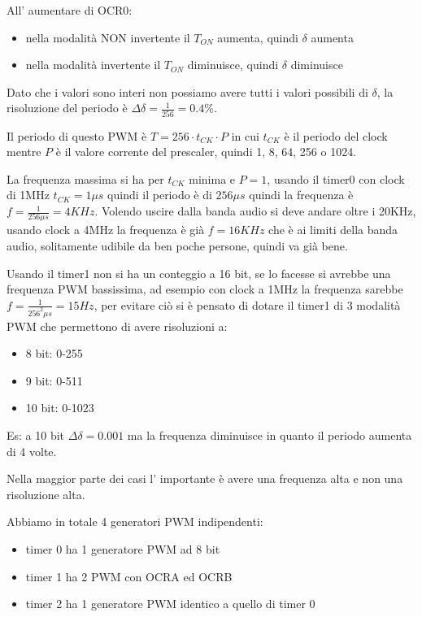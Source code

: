 All' aumentare di OCR0:
\begin{itemize}
    \item nella modalità NON invertente il $T_{ON}$ aumenta, quindi $\delta$ aumenta
    \item nella modalità invertente il $T_{ON}$ diminuisce, quindi $\delta$ diminuisce
\end{itemize}

Dato che i valori sono interi non possiamo avere tutti i valori possibili di $\delta$, la risoluzione del periodo è $\Delta\delta = \frac{1}{256} = 0.4\%$.

Il periodo di questo PWM è $T = 256 \cdot t_{CK} \cdot P$ in cui $t_{CK}$ è il periodo del clock mentre $P$ è il valore corrente del prescaler, quindi 1, 8, 64, 256 o 1024.

La frequenza massima si ha per $t_{CK}$ minima e $P=1$, usando il timer0 con clock di 1MHz $t_{CK} = 1 \mu s$ quindi il periodo è di $256 \mu s$ quindi la frequenza è $f = \frac{1}{256\mu s} = 4KHz$.
Volendo uscire dalla banda audio si deve andare oltre i 20KHz, usando clock a 4MHz la frequenza è già $f = 16KHz$ che è ai limiti della banda audio, solitamente udibile da ben poche persone, quindi va già bene.

Usando il timer1 non si ha un conteggio a 16 bit, se lo facesse si avrebbe una frequenza PWM bassissima, ad esempio con clock a 1MHz la frequenza sarebbe $f = \frac{1}{256^2 \mu s} = 15Hz$, per evitare ciò si è pensato di dotare il timer1 di 3 modalità PWM che permettono di avere risoluzioni a:
\begin{itemize}
    \item 8 bit: 0-255
    \item 9 bit: 0-511
    \item 10 bit: 0-1023
\end{itemize}
Es: a 10 bit $\Delta \delta = 0.001$ ma la frequenza diminuisce in quanto il periodo aumenta di 4 volte.

Nella maggior parte dei casi l' importante è avere una frequenza alta e non una risoluzione alta.

Abbiamo in totale 4 generatori PWM indipendenti:
\begin{itemize}
    \item timer 0 ha 1 generatore PWM ad 8 bit
    \item timer 1 ha 2 PWM con OCRA ed OCRB
    \item timer 2 ha 1 generatore PWM identico a quello di timer 0
\end{itemize}

